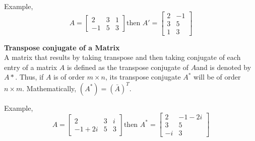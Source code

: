 \documentclass[12pt]{report}
\begin{document}
Example, \begin{equation*}
A = \begin{bmatrix}
2&3&1\\
-1&5&3
\end{bmatrix}
\text{then } A' = \begin{bmatrix}
2&-1\\
3&5\\
1&3
\end{bmatrix}
\end{equation*}
\begin{defn}
	\textbf{Transpose conjugate of a Matrix}\\
	A matrix that results by taking transpose and then taking conjugate of each entry of a matrix $A$ is defined as the transpose conjugate of $A$and is denoted by $A*$. Thus, if $A$ is of order $m \times n$, its transpose conjugate $A^*$ will be of order  $n \times m$. Mathematically, $(A^* ) = (\bar{A})^T$.
\end{defn}
Example, \begin{equation*}
A = \begin{bmatrix}
2&3&i\\
-1+2i&5&3
\end{bmatrix}
\text{then } A^* = \begin{bmatrix}
2&-1-2i\\
3&5\\
-i&3
\end{bmatrix}
\end{equation*}
\end{document}
